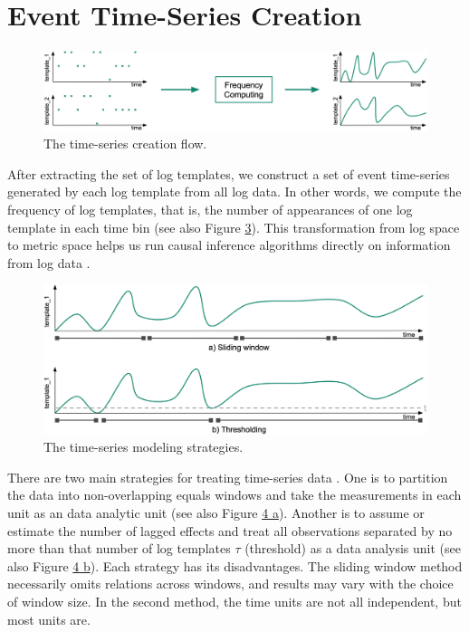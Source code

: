 \section{Event Time-Series Creation}
\label{sec:4}
\begin{figure}[H]
\centering
    \label{fig:ts-creation}
    \includegraphics[width=\textwidth]{figures/ts_creation.png}
    \caption{The time-series creation flow.}
\end{figure}
After extracting the set of log templates, we construct a set of event time-series generated by each log template from all log data. In other words, we compute the frequency of log templates, that is, the number of appearances of one log template in each time bin (see also Figure \hyperref[fig:ts-strategies]{3}). This transformation from log space to metric space helps us run causal inference algorithms directly on information from log data \cite{jia2017approach}.
\begin{figure}[H]
\centering
    \label{fig:ts-strategies}
    \includegraphics[width=\textwidth]{figures/ts_strategies.png}
    \caption{The time-series modeling strategies.}
\end{figure}
There are two main strategies for treating time-series data \cite{glymour2019review}. One is to partition the data into non-overlapping equals windows and take the measurements in each unit as an data analytic unit (see also Figure \hyperref[fig:ts-strategies]{4 a}). Another is to assume or estimate the number of lagged effects and treat all observations separated by no more than that number of log templates $\tau$ (threshold) as a data analysis unit (see also Figure \hyperref[fig:ts-strategies]{4 b}). Each strategy has its disadvantages. The sliding window method necessarily omits relations across windows, and results may vary with the choice of window size. In the second method, the time units are not all independent, but most units are.